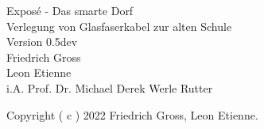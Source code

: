 %
%

\begin{titlepage}
	\begin{center}
		\Huge
			Exposé - Das smarte Dorf \\
		\vspace{5mm}
		\normalsize
		Verlegung von Glasfaserkabel zur alten Schule\\
		\vspace{1cm}
		\large
		Version 0.5dev\\
		\vspace {2 cm }
		Friedrich Gross \\
		Leon Etienne \\
		\vspace{1em}
		i.A. Prof. Dr. Michael Derek Werle Rutter 
	\end{center}
	\normalsize
	\vfill
	Copyright ( c ) 2022 Friedrich Gross, Leon Etienne.
\end{titlepage}
